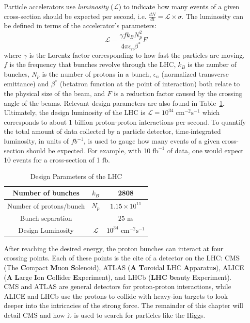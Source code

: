 Particle accelerators use \textit{luminosity} ($\mathcal{L}$) to indicate how many events of a given cross-section should be expected per second, i.e. $\frac{dN}{dt}=\mathcal{L}\times\sigma$. The luminosity can be defined in terms of the accelerator's parameters:
\begin{equation*}
\mathcal{L} = \frac{\gamma f k_{B}N_p^2}{4\pi \epsilon_{n} \beta^{*}}F
\end{equation*}
where $\gamma$ is the Lorentz factor corresponding to how fast the particles are moving, $f$ is the frequency that bunches revolve through the LHC, $k_{B}$ is the number of bunches, $N_p$ is the number of protons in a bunch, $\epsilon_n$ (normalized transverse emittance) and $\beta^{*}$ (betatron function at the point of interaction) both relate to the physical size of the beam, and $F$ is a reduction factor caused by the crossing angle of the beams. Relevant design parameters are also found in Table~\ref{tbl:LHCLumi}. Ultimately, the design luminosity of the LHC is $\mathcal{L} = 10^{34}$ $\mathrm{cm}^{-2}\mathrm{s}^{-1}$ which corresponds to about 1 billion proton-proton interactions per second. To quantify the total amount of data collected by a particle detector, time-integrated luminosity, in units of $fb^{-1}$, is used to gauge how many events of a given cross-section should be expected. For example, with 10 $\mathrm{fb}^{-1}$ of data, one would expect 10 events for a cross-section of 1 $\mathrm{fb}$.

\begin{table}[htp]
\begin{center}
\begin{tabular}{|c|c|c|}
\hline
Number of bunches & $k_B$ & 2808 \\
\hline
Number of protons/bunch & $N_p$ & $1.15\times10^{11}$ \\
\hline
Bunch separation & & 25 ns \\
\hline
Design Luminosity & $\mathcal{L}$ & $10^{34}$ $\mathrm{cm}^{-2}\mathrm{s}^{-1}$ \\
\hline
\end{tabular}
\caption{Design Parameters of the LHC}
\end{center}
\label{tbl:LHCLumi}
\end{table}%

After reaching the desired energy, the proton bunches can interact at four crossing points. Each of these points is the cite of a detector on the LHC: CMS (The \textbf{C}ompact \textbf{M}uon \textbf{S}olenoid), ATLAS (\textbf{A} \textbf{T}oroidal \textbf{L}HC \textbf{A}pparatu\textbf{s}), ALICE (\textbf{A} \textbf{L}arge \textbf{I}on \textbf{C}ollider \textbf{E}xperiment), and LHCb (\textbf{LHC} \textbf{b}eauty Experiment). CMS and ATLAS are general detectors for proton-proton interactions, while ALICE and LHCb use the protons to collide with heavy-ion targets to look deeper into the intricacies of the strong force. The remainder of this chapter will detail CMS and how it is used to search for particles like the Higgs.

